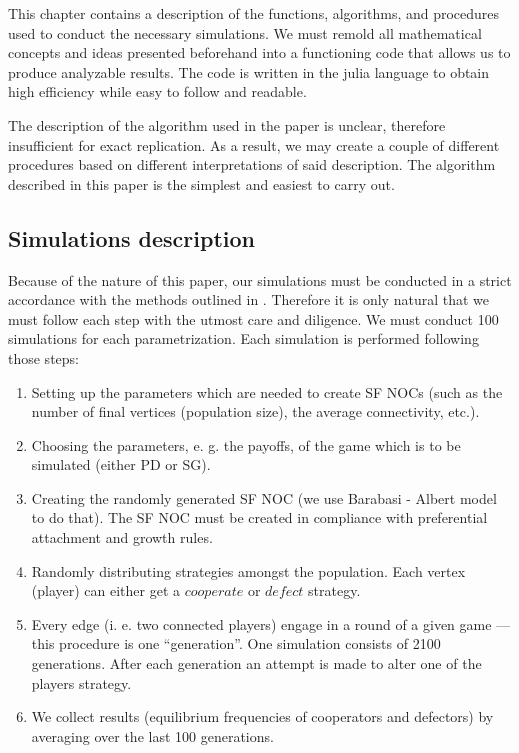 \documentclass[english, twoside, 12pt, a4paper]{article}
\theoremstyle{definition}
\theoremstyle{plain}
\theoremstyle{remark}
\begin{document}
This chapter contains a description of the functions, algorithms, and procedures used to conduct the necessary simulations. We must remold all mathematical concepts and ideas presented beforehand into a functioning code that allows us to produce analyzable results. The code is written in the julia language to obtain high efficiency while easy to follow and readable.

The description of the algorithm used in the paper \cite{santos2005scale} is unclear, therefore insufficient for exact replication. As a result, we may create a couple of different procedures based on different interpretations of said description. The algorithm described in this paper is the simplest and easiest to carry out. 

\subsection{Simulations description}

Because of the nature of this paper, our simulations must be conducted in a strict accordance with the methods outlined
in \cite{santos2005scale}. Therefore it is only natural that we must follow each step with the utmost care and diligence. We must conduct 100 simulations for each parametrization. Each simulation is performed following those steps:
\begin{enumerate}
  \item Setting up the parameters which are needed to create SF NOCs (such as the number of final vertices (population size), the average connectivity, etc.).
  \item Choosing the parameters, e. g. the payoffs, of the game which is to be simulated (either PD or SG).
  \item Creating the randomly generated SF NOC (we use Barabasi - Albert model to do that). The SF NOC must be created in compliance with preferential attachment and 
  growth rules.
  \item Randomly distributing strategies amongst the population. Each vertex (player) can either get a $cooperate$ or $defect$ strategy.
  \item Every edge (i. e. two connected players) engage in a round of a given game --- this procedure is one \enquote{generation}. One simulation consists of 2100 generations. After each generation an attempt is made to alter one of the players strategy.
  \item We collect results (equilibrium frequencies of cooperators and defectors) by averaging over the last 100 generations.
\end{enumerate}
\end{document}
